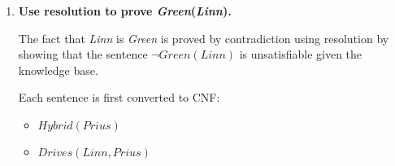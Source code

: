 \begin{enumerate}
\begin{enumerate}
\end{enumerate}

\item \textbf{Use resolution to prove \textit{Green}(\textit{Linn}).}

The fact that \textit{Linn} is \textit{Green} is proved by contradiction using resolution by showing that the sentence $\neg \textit{Green}(\textit{Linn})$ is unsatisfiable given the knowledge base. 

Each sentence is first converted to CNF:

\begin{itemize}
\item
$\textit{Hybrid}(\textit{Prius})$

\item
$\textit{Drives}(\textit{Linn}, \textit{Prius})$


\end{itemize}
\end{enumerate}
